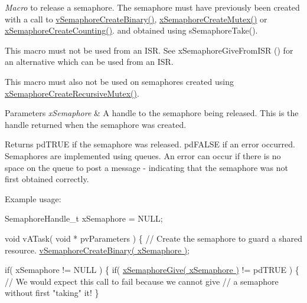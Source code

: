 {\itshape Macro} to release a semaphore. The semaphore must have previously been created with a call to \hyperlink{vendor_2ceedling_2plugins_2freertos_2src_2freertos_2include_2semphr_8h_ae10bffadd26fbd5bcce76bf33a83ef30}{v\+Semaphore\+Create\+Binary()}, \hyperlink{vendor_2ceedling_2plugins_2freertos_2src_2freertos_2include_2semphr_8h_aa6a00aa9b91a9e5b3ebe4ae1c3f115c6}{x\+Semaphore\+Create\+Mutex()} or \hyperlink{vendor_2ceedling_2plugins_2freertos_2src_2freertos_2include_2semphr_8h_a7764616a918a46115403569a88148ad4}{x\+Semaphore\+Create\+Counting()}. and obtained using s\+Semaphore\+Take().

This macro must not be used from an I\+SR. See x\+Semaphore\+Give\+From\+I\+SR () for an alternative which can be used from an I\+SR.

This macro must also not be used on semaphores created using \hyperlink{vendor_2ceedling_2plugins_2freertos_2src_2freertos_2include_2semphr_8h_a1bbc843be5a41ea83d2693b2189fc0f8}{x\+Semaphore\+Create\+Recursive\+Mutex()}.


\begin{DoxyParams}{Parameters}
{\em x\+Semaphore} & A handle to the semaphore being released. This is the handle returned when the semaphore was created.\\
\hline
\end{DoxyParams}
\begin{DoxyReturn}{Returns}
pd\+T\+R\+UE if the semaphore was released. pd\+F\+A\+L\+SE if an error occurred. Semaphores are implemented using queues. An error can occur if there is no space on the queue to post a message -\/ indicating that the semaphore was not first obtained correctly.
\end{DoxyReturn}
Example usage\+: 
\begin{DoxyPre}
SemaphoreHandle\_t xSemaphore = NULL;\end{DoxyPre}



\begin{DoxyPre}void vATask( void * pvParameters )
\{
   // Create the semaphore to guard a shared resource.
   \hyperlink{vendor_2ceedling_2plugins_2freertos_2src_2freertos_2include_2semphr_8h_ae10bffadd26fbd5bcce76bf33a83ef30}{vSemaphoreCreateBinary( xSemaphore )};\end{DoxyPre}



\begin{DoxyPre}   if( xSemaphore != NULL )
   \{
       if( \hyperlink{vendor_2ceedling_2plugins_2freertos_2src_2freertos_2include_2semphr_8h_aae55761cabfa9bf85c8f4430f78c0953}{xSemaphoreGive( xSemaphore )} != pdTRUE )
       \{
           // We would expect this call to fail because we cannot give
           // a semaphore without first "taking" it!
       \}\end{DoxyPre}



